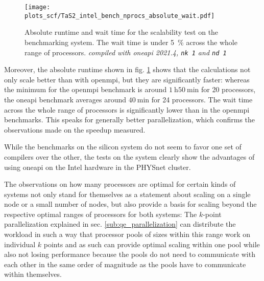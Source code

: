 \documentclass[main.tex]{subfiles}
\begin{document}
\begin{figure}
    \centering
    \texttt{[image: plots\_scf/TaS2\_intel\_bench\_nprocs\_absolute\_wait.pdf]}

    \caption{Absolute runtime and wait time for the scalability test on the \TaS benchmarking system. The wait time is under \SI{5}{\percent} across the whole range of processors. \emph{\QE compiled with \gls{oneapi} 2021.4, \texttt{nk 1} and \texttt{nd 1}}}
    \label{fig:scaling_scf_intel_nprocs_tas2_absolute_wait}
\end{figure}
Moreover, the absolute runtime shown in fig. \ref{fig:scaling_scf_intel_nprocs_tas2_absolute_wait} shows that the calculations not only scale better than with \gls{openmpi}, but they are significantly faster: whereas the minimum for the \gls{openmpi} benchmark is around \(\SI{1}{\hour} \SI{50}{\minute}\) for 20 processors, the \gls{oneapi} benchmark averages around \(\SI{40}{\minute}\) for 24 processors.
The wait time across the whole range of processors is significantly lower than in the \gls{openmpi} benchmarks.
This speaks for generally better parallelization, which confirms the observations made on the speedup measured.

While the benchmarks on the silicon system do not seem to favor one set of compilers over the other, the tests on the \TaS system clearly show the advantages of using \gls{oneapi} on the Intel hardware in the PHYSnet cluster.

The observations on how many processors are optimal for certain kinds of systems not only stand for themselves as a statement about scaling on a single node or a small number of nodes, but also provide a basis for scaling beyond the respective optimal ranges of processors for both systems:
The \(k\)-point parallelization explained in sec. \ref{sub:qe_parallelization} can distribute the workload in such a way that processor pools of sizes within this range work on individual \(k\) points and as such can provide optimal scaling within one pool while also not losing performance because the pools do not need to communicate with each other in the same order of magnitude as the pools have to communicate within themselves.
\end{document}
